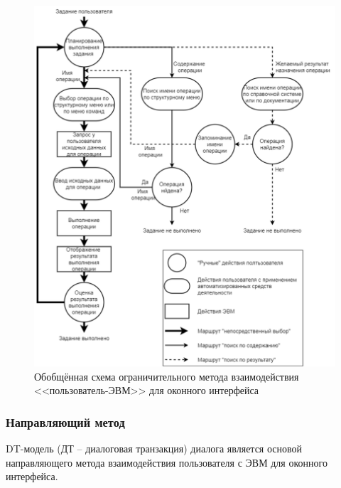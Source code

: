 \begin{figure}[!ht]
  \centering
  \includegraphics[scale=0.8]{ResearchNotes/rndhpc_not_gui_2022_10_10/scheme1.png}
  \caption{Обобщённая схема ограничительного метода взаимодействия <<пользователь-ЭВМ>> для оконного интерфейса}
  \label{rndhpcgui.2022.10.10.scheme1}
\end{figure}

\subsubsection{Направляющий метод}

DT-модель (ДТ – диалоговая транзакция) диалога является основой направляющего метода взаимодействия пользователя с ЭВМ для оконного интерфейса. 

